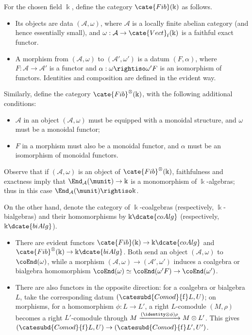 \begin{definition}\label{def:Fib-cat}
	For the chosen field $\Bbbk$, define the category
	$\cate{Fib}(\Bbbk)$ as follows.
	\begin{itemize}
		\item Its objects are data $(\mathcal{A}, \omega)$, where
		$\mathcal{A}$ is a locally finite abelian category (and hence
		essentially small), and
		$\omega: \mathcal{A} \to \cate{Vect}_{\mathrm{f}}(\Bbbk)$ is a
		faithful exact functor.
		\item A morphism from $(\mathcal{A}, \omega)$ to
		$(\mathcal{A}', \omega')$ is a datum $(F, \alpha)$, where
		$F: \mathcal{A} \to \mathcal{A}'$ is a functor and
		$\alpha: \omega \rightiso \omega' F$ is an isomorphism of functors.
		Identities and composition are defined in the evident way.
	\end{itemize}
	Similarly, define the category $\cate{Fib}^{\otimes}(\Bbbk)$, with the
	following additional conditions:
	\begin{itemize}
		\item $\mathcal{A}$ in an object $(\mathcal{A}, \omega)$ must be
		equipped with a monoidal structure, and $\omega$ must be a monoidal
		functor;
		\item $F$ in a morphism must also be a monoidal functor, and $\alpha$
		must be an isomorphism of monoidal functors.
	\end{itemize}
\end{definition}

Observe that if $(\mathcal{A}, \omega)$ is an object of
$\cate{Fib}^{\otimes}(\Bbbk)$, faithfulness and exactness imply that
$\End_{\mathcal{A}}(\munit) \to \Bbbk$ is a monomorphism of
$\Bbbk$-algebras; thus in this case
$\End_{\mathcal{A}}(\munit) \rightiso \Bbbk$.

On the other hand, denote the category of $\Bbbk$-coalgebras (respectively,
$\Bbbk$-bialgebras) and their homomorphisms by $\Bbbk\dcate{coAlg}$
(respectively, $\Bbbk\dcate{biAlg}$).
\begin{itemize}
	\item There are evident functors
	$\cate{Fib}(\Bbbk) \to \Bbbk\dcate{coAlg}$ and
	$\cate{Fib}^{\otimes}(\Bbbk) \to \Bbbk\dcate{biAlg}$. Both send an
	object $(\mathcal{A}, \omega)$ to $\coEnd(\omega)$, while a morphism
	$(\mathcal{A}, \omega) \to (\mathcal{A}', \omega')$ induces a
	coalgebra or bialgebra homomorphism
	$\coEnd(\omega) \simeq \coEnd(\omega' F) \to \coEnd(\omega')$.
	\item There are also functors in the opposite direction: for a coalgebra
	or bialgebra $L$, take the corresponding datum
	$\left(\catesubd{Comod}{\mathrm{f}}L, U \right)$; on morphisms, for a
	homomorphism $\phi: L \to L'$, a right $L$-comodule $(M, \rho)$ becomes
	a right $L'$-comodule through
	$M \xrightarrow{(\identity \otimes \phi) \rho} M \otimes L'$.
	This gives
	$\left(\catesubd{Comod}{\mathrm{f}}L, U \right) \to \left(\catesubd{Comod}{\mathrm{f}}L', U' \right)$.
\end{itemize}

